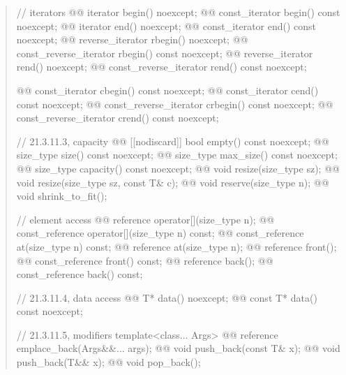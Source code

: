 \documentclass{wg21}
\begin{document}
\begin{quote}
\begin{codeblock}
{{    // iterators
    @@ iterator               begin() noexcept;
    @@ const_iterator         begin() const noexcept;
    @@ iterator               end() noexcept;
    @@ const_iterator         end() const noexcept;
    @@ reverse_iterator       rbegin() noexcept;
    @@ const_reverse_iterator rbegin() const noexcept;
    @@ reverse_iterator       rend() noexcept;
    @@ const_reverse_iterator rend() const noexcept;

    @@ const_iterator         cbegin() const noexcept;
    @@ const_iterator         cend() const noexcept;
    @@ const_reverse_iterator crbegin() const noexcept;
    @@ const_reverse_iterator crend() const noexcept;

    // 21.3.11.3, capacity
    @@ [[nodiscard]] bool empty() const noexcept;
    @@ size_type size() const noexcept;
    @@ size_type max_size() const noexcept;
    @@ size_type capacity() const noexcept;
    @@ void      resize(size_type sz);
    @@ void      resize(size_type sz, const T& c);
    @@ void      reserve(size_type n);
    @@ void      shrink_to_fit();

    // element access
    @@ reference       operator[](size_type n);
    @@ const_reference operator[](size_type n) const;
    @@ const_reference at(size_type n) const;
    @@ reference       at(size_type n);
    @@ reference       front();
    @@ const_reference front() const;
    @@ reference       back();
    @@ const_reference back() const;

    // 21.3.11.4, data access
    @@ T*       data() noexcept;
    @@ const T* data() const noexcept;

    // 21.3.11.5, modifiers
    template<class... Args> @@ reference emplace_back(Args&&... args);
    @@ void push_back(const T& x);
    @@ void push_back(T&& x);
    @@ void pop_back();

}}
\end{codeblock}
\end{quote}
\end{document}
